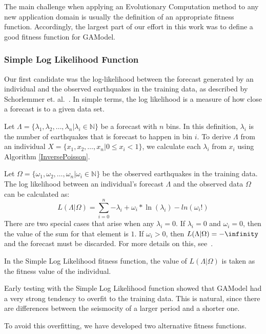 \documentclass{sig-alternate}
\begin{document}
The main challenge when applying an Evolutionary Computation method to
any new application domain is usually the definition of an appropriate
fitness function. Accordingly, the largest part of our effort in this
work was to define a good fitness function for GAModel.

\subsubsection{Simple Log Likelihood Function}

Our first candidate was the log-likelihood between the forecast
generated by an individual and the observed earthquakes in the
training data, as described by Schorlemmer
et. al.~\cite{Schorlemmer2007}. In simple terms, the log likelihood is
a measure of how close a forecast is to a given data set.

Let $\Lambda = \{\lambda_1, \lambda_2, \dots, \lambda_n | \lambda_i
\in \mathbb{N}\}$ be a forecast with $n$ bins. In this definition,
$\lambda_i$ is the number of earthquakes that is forecast to happen in
bin $i$. To derive $\Lambda$ from an individual $X = \{x_1, x_2,
\dots, x_n | 0 \leq x_i < 1\}$, we calculate each $\lambda_i$ from
$x_i$ using Algorithm \ref{InversePoisson}.

Let $\Omega = \{\omega_1, \omega_2, \dots, \omega_n | \omega_i \in
\mathbb{N}\}$ be the observed earthquakes in the training data. The
log likelihood between an individual's forecast $\Lambda$ and the
observed data $\Omega$ can be calculated as:
\begin{equation}
  L(\Lambda|\Omega) = \sum_{i=0}^n {-\lambda_i + \omega_i*\ln(\lambda_i)-ln(\omega_i!)}
\end{equation}
There are two special cases that arise when any $\lambda_i = 0$. If
$\lambda_i = 0$ and $\omega_i = 0$, then the value of the sum for that
element is $1$. If $\omega_i > 0$, then $L(\Lambda|\Omega) =
-\infinity$ and the forecast must be discarded. For more details on
this, see~\cite{Schorlemmer}.

In the Simple Log Likelihood fitness function, the value of
$L(\Lambda|\Omega)$ is taken as the fitness value of the individual.

Early testing with the Simple Log Likelihood function showed that
GAModel had a very strong tendency to overfit to the training
data. This is natural, since there are differences between the
seismocity of a larger period and a shorter one. 

To avoid this overfitting, we have developed two alternative fitness
functions.
\end{document}
